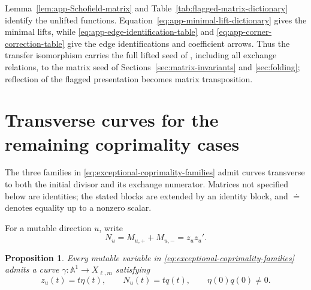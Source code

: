 \documentclass[11pt]{amsart}
\newtheorem{proposition}[theorem]{Proposition}
\theoremstyle{definition}
\theoremstyle{remark}
\begin{document}
Lemma~\ref{lem:app-Schofield-matrix} and
Table~\ref{tab:flagged-matrix-dictionary} identify the unlifted functions.
Equation~\eqref{eq:app-minimal-lift-dictionary} gives the minimal lifts, while
\eqref{eq:app-edge-identification-table} and
\eqref{eq:app-corner-correction-table} give the edge identifications and
coefficient arrows.  Thus the transfer isomorphism carries the full lifted
seed of \cite{FeiKroneckerII}, including all exchange relations, to the
matrix seed of Sections~\ref{sec:matrix-invariants} and \ref{sec:folding};
reflection of the flagged presentation becomes matrix transposition.

\section{Transverse curves for the remaining coprimality cases}
\label{app:exceptional-coprimality}

The three families in \eqref{eq:exceptional-coprimality-families} admit
curves transverse to both the initial divisor and its exchange numerator.
Matrices not specified below are identities; the stated blocks are extended by an
identity block, and $\doteq$ denotes equality up to a nonzero scalar.

For a mutable direction $u$, write
\[ N_u=M_{u,+}+M_{u,-}=z_uz_u'. \]

\begin{proposition}\label{prop:exceptional-specializations}
Every mutable variable in
\eqref{eq:exceptional-coprimality-families} admits a curve $\gamma:\mathbb A^1\to X_{\ell,m}$ satisfying
\[ z_u(t)=t\eta(t),\qquad N_u(t)=tq(t), \qquad \eta(0)q(0)\ne0. \]
\end{proposition}
\end{document}
